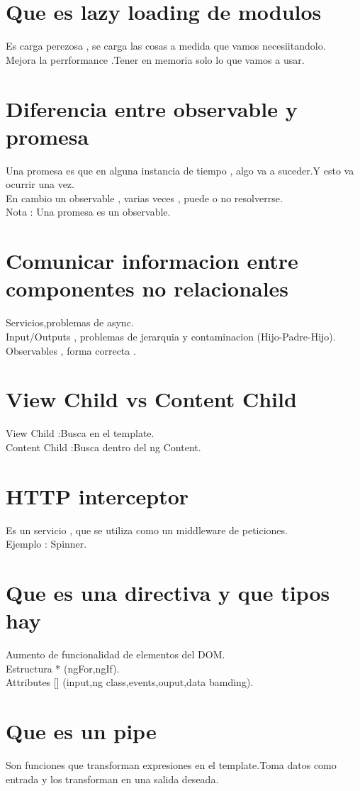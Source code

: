 \section{Que es lazy loading de modulos}
Es carga perezosa , se carga las cosas a medida que vamos necesiitandolo.\\
Mejora la perrformance .Tener en memoria 
solo lo que vamos a usar.
\section{Diferencia entre observable y promesa}
Una promesa es que en alguna instancia de tiempo , algo va a suceder.Y esto va ocurrir una vez.\\
En cambio un observable , varias veces , puede o no resolverrse.\\
Nota : Una promesa es un observable.
\section{Comunicar informacion entre componentes no relacionales}
Servicios,problemas de async.\\
Input/Outputs , problemas de jerarquia y contaminacion (Hijo-Padre-Hijo).\\
Observables , forma correcta .
\section{View Child vs Content Child}
View Child :Busca en el template.\\
Content Child :Busca dentro del ng Content.
\section{HTTP interceptor}
Es un servicio , que se utiliza como un middleware de peticiones.\\
Ejemplo : Spinner.
\section{Que es una directiva y que tipos hay}
Aumento de funcionalidad de elementos del DOM.\\
Estructura * (ngFor,ngIf).\\
Attributes [{}] (input,ng class,events,ouput,data bamding).
\section{Que es un pipe}
Son funciones que transforman expresiones en el template.Toma datos como entrada y los
transforman en una salida deseada.
